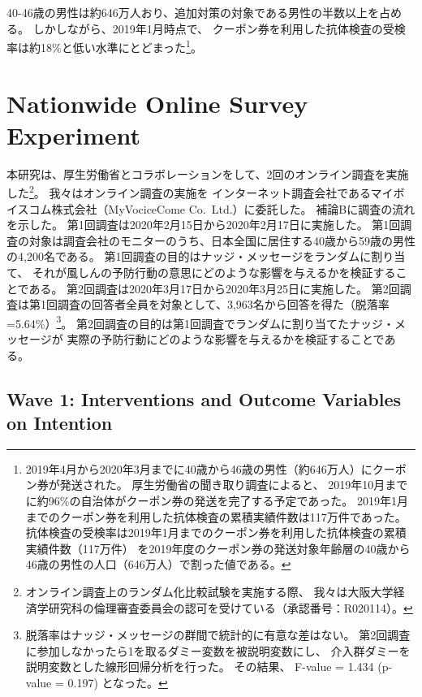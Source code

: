 \documentclass[
  11pt,
  a4paper,
]{article}
\begin{document}
40-46歳の男性は約646万人おり、追加対策の対象である男性の半数以上を占める。
しかしながら、2019年1月時点で、
クーポン券を利用した抗体検査の受検率は約18\%と低い水準にとどまった\footnote{2019年4月から2020年3月までに40歳から46歳の男性（約646万人）にクーポン券が発送された。
  厚生労働省の聞き取り調査によると、
  2019年10月までに約96\%の自治体がクーポン券の発送を完了する予定であった。
  2019年1月までのクーポン券を利用した抗体検査の累積実績件数は117万件であった。
  抗体検査の受検率は2019年1月までのクーポン券を利用した抗体検査の累積実績件数（117万件）
  を2019年度のクーポン券の発送対象年齢層の40歳から46歳の男性の人口（646万人）で割った値である。
}。

\hypertarget{experiment}{%
\section{Nationwide Online Survey Experiment}\label{experiment}}

本研究は、厚生労働省とコラボレーションをして、2回のオンライン調査を実施した\footnote{オンライン調査上のランダム化比較試験を実施する際、
  我々は大阪大学経済学研究科の倫理審査委員会の認可を受けている（承認番号：R020114）。}。
我々はオンライン調査の実施を
インターネット調査会社であるマイボイスコム株式会社（MyVociceCome Co.~Ltd.）に委託した。
補論Bに調査の流れを示した。
第1回調査は2020年2月15日から2020年2月17日に実施した。
第1回調査の対象は調査会社のモニターのうち、日本全国に居住する40歳から59歳の男性の4,200名である。
第1回調査の目的はナッジ・メッセージをランダムに割り当て、
それが風しんの予防行動の意思にどのような影響を与えるかを検証することである。
第2回調査は2020年3月17日から2020年3月25日に実施した。
第2回調査は第1回調査の回答者全員を対象として、3,963名から回答を得た（脱落率=5.64\%）\footnote{脱落率はナッジ・メッセージの群間で統計的に有意な差はない。
  第2回調査に参加しなかったら1を取るダミー変数を被説明変数にし、
  介入群ダミーを説明変数とした線形回帰分析を行った。
  その結果、
  F-value = 1.434 (p-value = 0.197)
  となった。}。
第2回調査の目的は第1回調査でランダムに割り当てたナッジ・メッセージが
実際の予防行動にどのような影響を与えるかを検証することである。

\hypertarget{wave1}{%
\subsection{Wave 1: Interventions and Outcome Variables on Intention}\label{wave1}}
\end{document}
